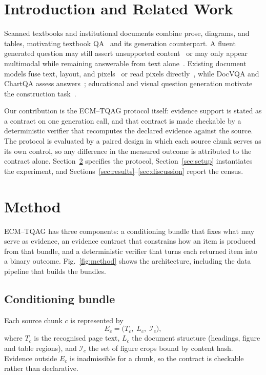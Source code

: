 \documentclass[conference]{IEEEtran}
\begin{document}
\section{Introduction and Related Work}
Scanned textbooks and institutional documents combine prose, diagrams,
and tables, motivating textbook QA~\cite{kembhavi2017tqa} and its
generation counterpart. A fluent generated question may still assert
unsupported content~\cite{ji2023hallucination} or may only appear
multimodal while remaining answerable from text
alone~\cite{goyal2017making,agrawal2018don}. Existing document models
fuse text, layout, and pixels~\cite{xu2020layoutlm,xu2021layoutlmv2,
huang2022layoutlmv3} or read pixels directly~\cite{kim2022donut,
lee2023pix2struct}, while DocVQA and ChartQA assess
answers~\cite{mathew2021docvqa,masry2022chartqa}; educational and
visual question generation motivate the construction
task~\cite{heilman2010good,kurdi2020systematic,mostafazadeh2016generating}.

Our contribution is the ECM--TQAG protocol itself: evidence support is
stated as a contract on one generation call, and that contract is made
checkable by a deterministic verifier that recomputes the declared
evidence against the source. The protocol is evaluated by a paired
design in which each source chunk serves as its own control, so any
difference in the measured outcome is attributed to the contract alone.
Section~\ref{sec:method} specifies the protocol,
Section~\ref{sec:setup} instantiates the experiment, and
Sections~\ref{sec:results}--\ref{sec:discussion} report the census.

\section{Method}
\label{sec:method}
ECM--TQAG has three components: a conditioning bundle that fixes what
may serve as evidence, an evidence contract that constrains how an item
is produced from that bundle, and a deterministic verifier that turns
each returned item into a binary outcome. Fig.~\ref{fig:method} shows
the architecture, including the data pipeline that builds the bundles.

\subsection{Conditioning bundle}
Each source chunk $c$ is represented by
\begin{equation}
E_c=\bigl(T_c,\;L_c,\;\mathcal I_c\bigr),
\end{equation}
where $T_c$ is the recognised page text, $L_c$ the document structure
(headings, figure and table regions), and $\mathcal I_c$ the set of
figure crops bound by content hash. Evidence outside $E_c$ is
inadmissible for a chunk, so the contract is checkable rather than
declarative.
\end{document}
